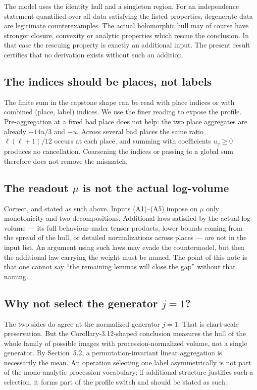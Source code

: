 \documentclass[11pt]{article}
\theoremstyle{definition}
\begin{document}
The model uses the identity hull and a singleton region.  For an
independence statement quantified over all data satisfying the
listed properties, degenerate data are legitimate
counterexamples.  The actual holomorphic hull may of course have
stronger closure, convexity or analytic properties which rescue
the conclusion.  In that case the rescuing property is exactly
an additional input.  The present result certifies that no
derivation exists without such an addition.

\subsection{The indices should be places, not labels}

The finite sum in the capstone shape can be read with place
indices or with combined (place, label) indices.  We use the
finer reading to expose the profile.  Pre-aggregation at a fixed
bad place does not help: the two place aggregates are already
$-14u/3$ and $-u$.  Across several bad places the same ratio
$\ell(\ell+1)/12$ occurs at each place, and summing with
coefficients $u_{\underline v}\ge0$ produces no cancellation.
Coarsening the indices or passing to a global sum therefore does
not remove the mismatch.

\subsection{The readout $\mu$ is not the actual log-volume}

Correct, and stated as such above.  Inputs (A1)--(A5) impose on
$\mu$ only monotonicity and two decompositions.  Additional laws
satisfied by the actual log-volume --- its full behaviour under
tensor products, lower bounds coming from the spread of the
hull, or detailed normalizations across places --- are not in
the input list.  An argument using such laws may evade the
countermodel, but then the additional law carrying the weight
must be named.  The point of this note is that one cannot say
``the remaining lemmas will close the gap'' without that naming.

\subsection{Why not select the generator $j=1$?}

The two sides do agree at the normalized generator $j=1$.  That
is chart-scale preservation.  But the Corollary-3.12-shaped
conclusion measures the hull of the whole family of possible
images with procession-normalized volume, not a single
generator.  By Section~5.2, a permutation-invariant linear
aggregation is necessarily the mean.  An operation selecting
one label asymmetrically is not part of the mono-analytic
procession vocabulary; if additional structure justifies such a
selection, it forms part of the profile switch and should be
stated as such.
\end{document}
